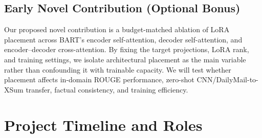 \documentclass[11pt, letterpaper]{article}
\begin{document}
\subsection{Early Novel Contribution (Optional Bonus)}

Our proposed novel contribution is a budget-matched ablation of LoRA placement
across BART's encoder self-attention, decoder self-attention, and
encoder--decoder cross-attention. By fixing the target projections, LoRA rank,
and training settings, we isolate architectural placement as the main variable
rather than confounding it with trainable capacity. We will test whether
placement affects in-domain ROUGE performance, zero-shot CNN/DailyMail-to-XSum
transfer, factual consistency, and training efficiency.

\section{Project Timeline and Roles}
\end{document}
